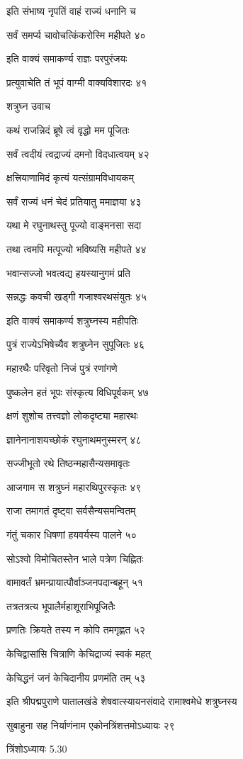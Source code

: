 इति संभाष्य नृपतिं वाहं राज्यं धनानि च

सर्वं समर्प्य चावोचत्किंकरोस्मि महीपते ४०

इति वाक्यं समाकर्ण्य राज्ञः परपुरंजयः

प्रत्युवाचेति तं भूपं वाग्मी वाक्यविशारदः ४१

शत्रुघ्न उवाच

कथं राजन्निदं ब्रूषे त्वं वृद्धो मम पूजितः

सर्वं त्वदीयं त्वद्राज्यं दमनो विदधात्वयम् ४२

क्षत्त्रियाणामिदं कृत्यं यत्संग्रामविधायकम्

सर्वं राज्यं धनं चेदं प्रतियातु ममाज्ञया ४३

यथा मे रघुनाथस्तु पूज्यो वाङ्मनसा सदा

तथा त्वमपि मत्पूज्यो भविष्यसि महीपते ४४

भवान्सज्जो भवत्वद्य हयस्यानुगमं प्रति

सन्नद्धः कवची खड्गी गजाश्वरथसंयुतः ४५

इति वाक्यं समाकर्ण्य शत्रुघ्नस्य महीपतिः

पुत्रं राज्येऽभिषेच्यैव शत्रुघ्नेन सुपूजितः ४६

महारथैः परिवृतो निजं पुत्रं रणांगणे

पुष्कलेन हतं भूपः संस्कृत्य विधिपूर्वकम् ४७

क्षणं शुशोच तत्त्वज्ञो लोकदृष्ट्या महारथः

ज्ञानेनानाशयच्छोकं रघुनाथमनुस्मरन् ४८

सज्जीभूतो रथे तिष्ठन्महासैन्यसमावृतः

आजगाम स शत्रुघ्नं महारथिपुरस्कृतः ४९

राजा तमागतं दृष्ट्वा सर्वसैन्यसमन्वितम्

गंतुं चकार धिषणां हयवर्यस्य पालने ५०

सोऽश्वो विमोचितस्तेन भाले पत्रेण चिह्नितः

वामावर्तं भ्रमन्प्रायात्पौर्वाञ्जनपदान्बहून् ५१

तत्रतत्रत्य भूपालैर्महाशूराभिपूजितैः

प्रणतिः क्रियते तस्य न कोपि तमगृह्णत ५२

केचिद्वासांसि चित्राणि केचिद्राज्यं स्वकं महत्

केचिद्धनं जनं केचिदानीय प्रणमंति तम् ५३

इति श्रीपद्मपुराणे पातालखंडे शेषवात्स्यायनसंवादे रामाश्वमेधे शत्रुघ्नस्य

सुबाहुना सह निर्याणंनाम एकोनत्रिंशत्तमोऽध्यायः २९

त्रिंशोऽध्यायः 5.30

